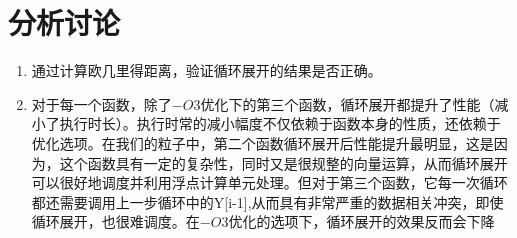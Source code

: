 \documentclass[english]{ctexart}
\begin{document}
\section{分析讨论}
\begin{enumerate}
\item 通过计算欧几里得距离，验证循环展开的结果是否正确。
\item 对于每一个函数，除了$-O3$优化下的第三个函数，循环展开都提升了性能（减小了执行时长）。执行时常的减小幅度不仅依赖于函数本身的性质，还依赖于优化选项。在我们的粒子中，第二个函数循环展开后性能提升最明显，这是因为，这个函数具有一定的复杂性，同时又是很规整的向量运算，从而循环展开可以很好地调度并利用浮点计算单元处理。但对于第三个函数，它每一次循环都还需要调用上一步循环中的Y{[}i-1{]},从而具有非常严重的数据相关冲突，即使循环展开，也很难调度。在$-O3$优化的选项下，循环展开的效果反而会下降


\end{enumerate}
\end{document}
